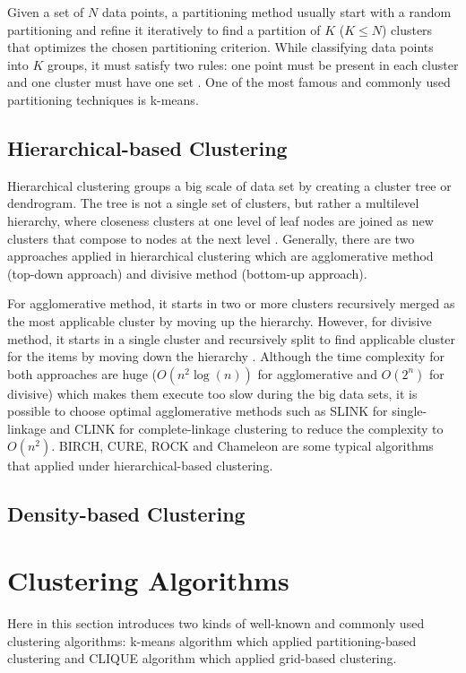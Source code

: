 \documentclass[sigconf]{acmart}
\begin{document}
Given a set of $N$ data points, a partitioning method usually start with a random partitioning and refine it iteratively to find a partition of $K$ ($K \leq N$) clusters that optimizes the chosen partitioning criterion. While classifying data points into $K$ groups, it must satisfy two rules: one point must be present in each cluster and one cluster must have one set \cite{dcar}. One of the most famous and commonly used partitioning techniques is k-means.

\subsection{Hierarchical-based Clustering}

Hierarchical clustering groups a big scale of data set by creating a cluster tree or dendrogram. The tree is not a single set of clusters, but rather a multilevel hierarchy, where closeness clusters at one level of leaf nodes are joined as new clusters that compose to nodes at the next level \cite{math}. Generally, there are two approaches applied in hierarchical clustering which are agglomerative method (top-down approach) and divisive method (bottom-up approach).

For agglomerative method, it starts in two or more clusters recursively merged as the most applicable cluster by moving up the hierarchy. However, for divisive method, it starts in a single cluster and recursively split to find applicable cluster for the items by moving down the hierarchy \cite{dcar}. Although the time complexity for both approaches are huge ($O(n^2\log(n))$ for agglomerative and $O(2^n)$ for divisive) which makes them execute too slow during the big data sets, it is possible to choose optimal agglomerative methods such as SLINK for single-linkage and CLINK for complete-linkage clustering to reduce the complexity to $O(n^2)$. BIRCH, CURE, ROCK and Chameleon are some typical algorithms that applied under hierarchical-based clustering.

\subsection{Density-based Clustering}

\section{Clustering Algorithms}

Here in this section introduces two kinds of well-known and commonly used clustering algorithms: k-means algorithm which applied partitioning-based clustering and CLIQUE algorithm which applied grid-based clustering.
\end{document}
